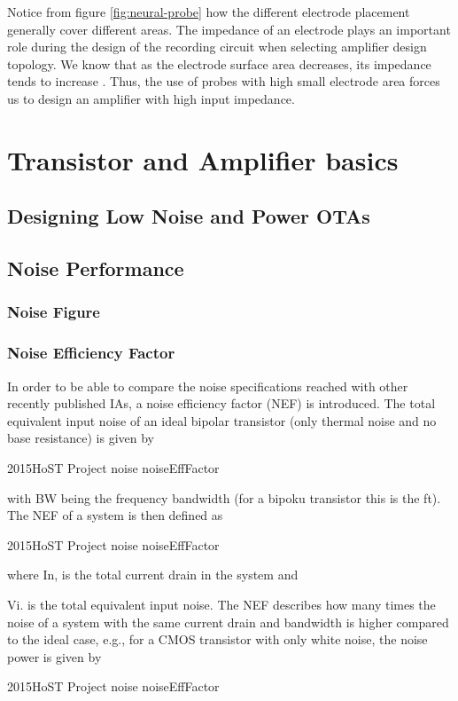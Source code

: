     Notice from figure \ref{fig:neural-probe} how the different electrode placement generally cover different areas. The impedance of an electrode plays an 
    important role during the design of the recording circuit when selecting amplifier design topology. We know that as the electrode surface 
    area decreases, its impedance tends to increase \cite{yoo2011biomedical-cmos}. Thus, the use of probes with high small electrode area
    forces us to design an amplifier with high input impedance.
   
   
   \section{Transistor and Amplifier basics}
    \label{subsec:trans-amp-basics}
      \subsection{Designing Low Noise and Power \acs{OTA}s}
      \subsection{Noise Performance}
	\subsubsection{Noise Figure}
        
        
	\subsubsection{Noise Efficiency Factor}
	In order to be able to compare the noise specifications
reached with other recently published IAs, a noise efficiency factor (NEF) is introduced. The total equivalent
input noise of an ideal bipolar transistor (only thermal
noise and no base resistance) is given by

2015HoST Project noise noiseEffFactor

with BW being the frequency bandwidth (for a bipoku
transistor this is the ft). The NEF of a system is then
defined as

2015HoST Project noise noiseEffFactor

where In, is the total current drain in the system and

Vi. is the total equivalent input noise. The NEF describes how many times the noise of a system with the
same current drain and bandwidth is higher compared to
the ideal case, e.g., for a CMOS transistor with only white
noise, the noise power is given by

2015HoST Project noise noiseEffFactor

  